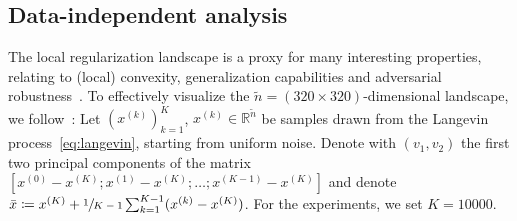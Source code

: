 \documentclass[twocolumn]{article}
\newcommand{\R}{\mathbb{R}}
\begin{document}
\subsection{Data-independent analysis}
The local regularization landscape is a proxy for many interesting properties, relating to (local) convexity, generalization capabilities and adversarial robustness~\cite{Stutz_2021_adversarial}.
To effectively visualize the \( \tilde{n} = (\num{320} \times \num{320}) \)-dimensional landscape, we follow~\cite{li_2018_visualizing}:
Let \( {(x^{(k)})}_{k=1}^{K} \), \( x^{(k)} \in \R^{\tilde{n}} \) be samples drawn from the Langevin process~\cref{eq:langevin}, starting from uniform noise.
Denote with \( (v_1, v_2) \) the first two principal components of the matrix \( [x^{(0)} - x^{(K)};x^{(1)} - x^{(K)};\dotsc;x^{(K-1)} - x^{(K)} ] \) and denote \( \bar{x} \coloneqq x^{(K)} + \sfrac{1}{K-1} \sum_{k=1}^{K-1} (x^{(k)} - x^{(K)}) \).
For the experiments, we set \( K = \num{10000} \).
\end{document}
